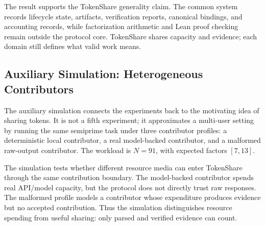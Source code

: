 \documentclass{article}
\theoremstyle{plain}
\begin{document}
{\color{blue}
The result supports the TokenShare generality claim. The common system records lifecycle state, artifacts, verification reports, canonical bindings, and accounting records, while factorization arithmetic and Lean proof checking remain outside the protocol core. TokenShare shares capacity and evidence; each domain still defines what valid work means.
}

\FloatBarrier

\subsection{Auxiliary Simulation: Heterogeneous Contributors}
\label{subsec:aux-heterogeneous-contributors}

{\color{blue}
The auxiliary simulation connects the experiments back to the motivating idea of sharing tokens. It is not a fifth experiment; it approximates a multi-user setting by running the same semiprime task under three contributor profiles: a deterministic local contributor, a real model-backed contributor, and a malformed raw-output contributor. The workload is \(N=91\), with expected factors \([7,13]\).

The simulation tests whether different resource media can enter TokenShare through the same contribution boundary. The model-backed contributor spends real API/model capacity, but the protocol does not directly trust raw responses. The malformed profile models a contributor whose expenditure produces evidence but no accepted contribution. Thus the simulation distinguishes resource spending from useful sharing: only parsed and verified evidence can count.
}
\end{document}

